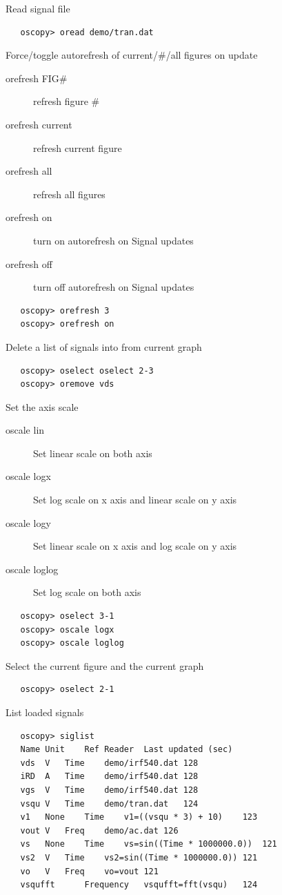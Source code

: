 \documentclass[a4paper,11pt]{article}
\begin{document}
   Read signal file
\begin{verbatim}
   oscopy> oread demo/tran.dat
\end{verbatim}

   Force/toggle autorefresh of current/\#/all figures on update
   \begin{description}
   \item[orefresh FIG\#] refresh figure \#
   \item[orefresh current] refresh current figure
   \item[orefresh all]  refresh all figures
   \item[orefresh on] turn on autorefresh on Signal updates
   \item[orefresh off] turn off autorefresh on Signal updates
   \end{description}

\begin{verbatim}
   oscopy> orefresh 3
   oscopy> orefresh on
\end{verbatim}

   Delete a list of signals into from current graph
\begin{verbatim}
   oscopy> oselect oselect 2-3
   oscopy> oremove vds
\end{verbatim}

   Set the axis scale
   \begin{description}
   \item[oscale lin] Set linear scale on both axis
   \item[oscale logx] Set log scale on x axis and linear scale on y axis
   \item[oscale logy] Set linear scale on x axis and log scale on y axis
   \item[oscale loglog] Set log scale on both axis
   \end{description}

\begin{verbatim}
   oscopy> oselect 3-1
   oscopy> oscale logx
   oscopy> oscale loglog
\end{verbatim}

   Select the current figure and the current graph
\begin{verbatim}
   oscopy> oselect 2-1
\end{verbatim}

   List loaded signals
\begin{verbatim}
   oscopy> siglist
   Name	Unit	Ref	Reader	Last updated (sec)
   vds	V	Time	demo/irf540.dat	128
   iRD	A	Time	demo/irf540.dat	128
   vgs	V	Time	demo/irf540.dat	128
   vsqu	V	Time	demo/tran.dat	124
   v1	None	Time	v1=((vsqu * 3) + 10)	123
   vout	V	Freq	demo/ac.dat	126
   vs	None	Time	vs=sin((Time * 1000000.0))	121
   vs2	V	Time	vs2=sin((Time * 1000000.0))	121
   vo	V	Freq	vo=vout	121
   vsqufft		Frequency	vsqufft=fft(vsqu)	124
\end{verbatim}
\end{document}

